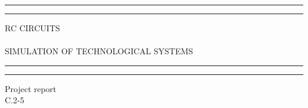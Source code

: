 

\begin{titlepage} %

	\centering %
	
	\scshape %
	
	\vspace*{\baselineskip} %
	
	
	\rule{\textwidth}{1.6pt}\vspace*{-\baselineskip}\vspace*{2pt} %
	\rule{\textwidth}{0.4pt} %
	
	\vspace{0.75\baselineskip} %
	
	{\LARGE RC CIRCUITS\\~\\\large SIMULATION OF TECHNOLOGICAL SYSTEMS } %
	
	\vspace{0.75\baselineskip} %
	
	\rule{\textwidth}{0.4pt}\vspace*{-\baselineskip}\vspace{3.2pt} %
	\rule{\textwidth}{1.6pt} %
	
	\vspace{2\baselineskip} %
	
	
	\Large Project report\\\large C.2-5%
	
	\vspace*{3\baselineskip} %
	
	

\end{titlepage}
